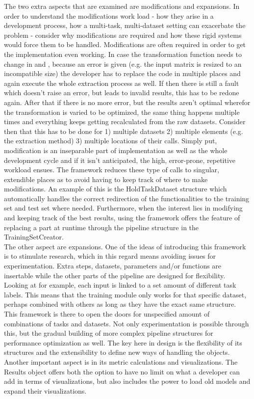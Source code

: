 The two extra aspects that are examined are modifications and expansions. In order to understand the modifications work load - how they arise in a development process, how a multi-task, multi-dataset setting can exacerbate the problem - consider why modifications are required and how these rigid systems would force them to be handled. Modifications are often required in order to get the implementation even working. In case the transformation function needs to change in \cite{pytorchmultitask} and \cite{multiclasstutorial}, because an error is given (e.g. the input matrix is resized to an incompatible size) the developer has to replace the code in multiple places and again execute the whole extraction process as well. If then there is still a fault which doesn't raise an error, but leads to invalid results, this has to be redone again. After that if there is no more error, but the results aren't optimal wherefor the transformation is varied to be optimized, the same thing happens multiple times and everything keeps getting recalculated from the raw datasets. Consider then that this has to be done for 1) multiple datasets 2) multiple elements (e.g. the extraction method) 3) multiple locations of their calls. Simply put, modification is an inseparable part of implementation as well as the whole development cycle and if it isn't anticipated, the high, error-prone, repetitive workload ensues. The framework reduces these type of calls to singular, extendible places as to avoid having to keep track of where to make modifications. An example of this is the HoldTaskDataset structure which automatically handles the correct redirection of the functionalities to the training set and test set where needed. Furthermore, when the interest lies in modifying and keeping track of the best results, using the framework offers the feature of replacing a part at runtime through the pipeline structure in the TrainingSetCreator. \\  

The other aspect are expansions. One of the ideas of introducing this framework is to stimulate research, which in this regard means avoiding issues for experimentation. Extra steps, datasets, parameters and/or functions are insertable while the other parts of the pipeline are designed for flexibility. Looking at \cite{pytorchmultitask} for example, each input is linked to a set amount of different task labels. This means that the training module only works for that specific dataset, perhaps combined with others as long as they have the exact same structure. This framework is there to open the doors for unspecified amount of combinations of tasks and datasets. Not only experimentation is possible through this, but the gradual building of more complex pipeline structures for performance optimization as well. The key here in design is the flexibility of its structures and the extensibility to define new ways of handling the objects. Another important aspect is in its metric calculations and visualizations. The Results object offers both the option to have no limit on what a developer can add in terms of visualizations, but also includes the power to load old models and expand their visualizations.\\

